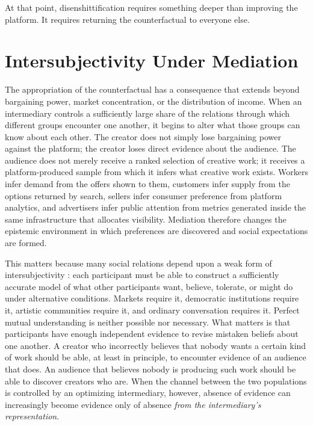 \documentclass[11pt]{article}
\begin{document}
At that point, disenshittification requires something deeper than improving the platform. It requires returning the counterfactual to everyone else.

\section{Intersubjectivity Under Mediation}

The appropriation of the counterfactual has a consequence that extends beyond bargaining power, market concentration, or the distribution of income. When an intermediary controls a sufficiently large share of the relations through which different groups encounter one another, it begins to alter what those groups can know about each other. The creator does not simply lose bargaining power against the platform; the creator loses direct evidence about the audience. The audience does not merely receive a ranked selection of creative work; it receives a platform-produced sample from which it infers what creative work exists. Workers infer demand from the offers shown to them, customers infer supply from the options returned by search, sellers infer consumer preference from platform analytics, and advertisers infer public attention from metrics generated inside the same infrastructure that allocates visibility. Mediation therefore changes the epistemic environment in which preferences are discovered and social expectations are formed.

This matters because many social relations depend upon a weak form of intersubjectivity \parencite{pachniewski2023intersubjectivity}: each participant must be able to construct a sufficiently accurate model of what other participants want, believe, tolerate, or might do under alternative conditions. Markets require it, democratic institutions require it, artistic communities require it, and ordinary conversation requires it. Perfect mutual understanding is neither possible nor necessary. What matters is that participants have enough independent evidence to revise mistaken beliefs about one another. A creator who incorrectly believes that nobody wants a certain kind of work should be able, at least in principle, to encounter evidence of an audience that does. An audience that believes nobody is producing such work should be able to discover creators who are. When the channel between the two populations is controlled by an optimizing intermediary, however, absence of evidence can increasingly become evidence only of absence \emph{from the intermediary's representation}.
\end{document}
